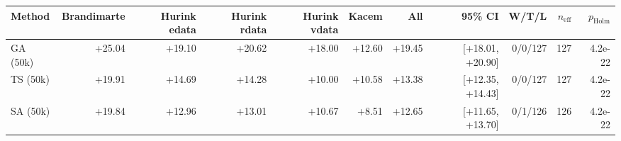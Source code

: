\begin{tabular}{lrrrrrrrrrr}
\toprule
Method & Brandimarte & Hurink edata & Hurink rdata & Hurink vdata & Kacem & All & 95\% CI & W/T/L & $n_{\mathrm{eff}}$ & $p_{\mathrm{Holm}}$ \\
\midrule
GA (50k) & +25.04 & +19.10 & +20.62 & +18.00 & +12.60 & +19.45 & [+18.01, +20.90] & 0/0/127 & 127 & 4.2e-22 \\
TS (50k) & +19.91 & +14.69 & +14.28 & +10.00 & +10.58 & +13.38 & [+12.35, +14.43] & 0/0/127 & 127 & 4.2e-22 \\
SA (50k) & +19.84 & +12.96 & +13.01 & +10.67 & +8.51 & +12.65 & [+11.65, +13.70] & 0/1/126 & 126 & 4.2e-22 \\
\bottomrule
\end{tabular}
